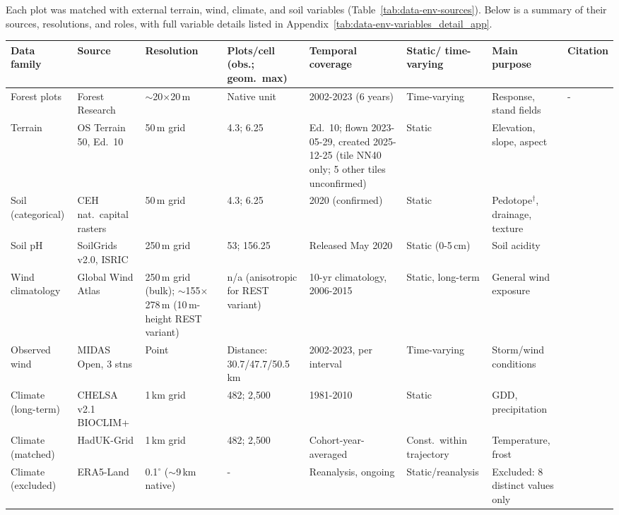 \documentclass[logo,msc,ai]{infthesis}           %
\begin{document}
Each plot was matched with external terrain, wind, climate, and soil variables (Table~\ref{tab:data-env-sources}). Below is a summary of their sources, resolutions, and roles, with full variable details listed in Appendix~\ref{tab:data-env-variables_detail_app}.

\begin{table}[!htbp]
\tiny
\setlength{\tabcolsep}{2pt}
\renewcommand{\arraystretch}{0.9}
\begin{tabular}{p{1.6cm}p{2.1cm}p{1.6cm}p{1.5cm}p{2.3cm}p{1.6cm}p{2.3cm}p{0.7cm}}
\hline
Data family & Source & Resolution & Plots/cell (obs.; geom.\ max) & Temporal coverage & Static/ time-varying & Main purpose & Citation \\
\hline
Forest plots & Forest Research & $\sim$20$\times$20\,m & Native unit & 2002-2023 (6 years) & Time-varying & Response, stand fields & - \\
Terrain & OS Terrain 50, Ed.\ 10 & 50\,m grid & 4.3; 6.25 & Ed.\ 10; flown 2023-05-29, created 2025-12-25 (tile NN40 only; 5 other tiles unconfirmed) & Static & Elevation, slope, aspect & \cite{ordnancesurveyTerrain50_C3_LID} \\
Soil (categorical) & CEH nat.\ capital rasters & 50\,m grid & 4.3; 6.25 & 2020 (confirmed) & Static & Pedotope$^{\dagger}$, drainage, texture & \cite{feeney2026CEHNaturalCapital_C3_LID} \\
Soil pH & SoilGrids v2.0, ISRIC & 250\,m grid & 53; 156.25 & Released May 2020 & Static (0-5\,cm) & Soil acidity & \cite{poggio2021SoilGrids_C3_LID} \\
Wind climatology & Global Wind Atlas & 250\,m grid (bulk); $\sim$155$\times$278\,m (10\,m-height REST variant) & n/a (anisotropic for REST variant) & 10-yr climatology, 2006-2015 & Static, long-term & General wind exposure & \cite{davis2023GlobalWindAtlas_C3_LID} \\
Observed wind & MIDAS Open, 3 stns & Point & Distance: 30.7/47.7/50.5\,km & 2002-2023, per interval & Time-varying & Storm/wind conditions & \cite{metoffice2019MIDASOpen_C3_LID} \\
Climate (long-term) & CHELSA v2.1 BIOCLIM+ & 1\,km grid & 482; 2{,}500 & 1981-2010 & Static & GDD, precipitation & \cite{karger2017CHELSA_C3_LID} \\
Climate (matched) & HadUK-Grid & 1\,km grid & 482; 2{,}500 & Cohort-year-averaged & Const.\ within trajectory & Temperature, frost & \cite{hollis2019HadUKGrid_C3_LID} \\
Climate (excluded) & ERA5-Land & 0.1$^\circ$ ($\sim$9\,km native) & - & Reanalysis, ongoing & Static/reanalysis & Excluded: 8 distinct values only & \cite{munozsabater2021ERA5Land_C3_LID} \\

\end{tabular}
\end{table}
\end{document}
